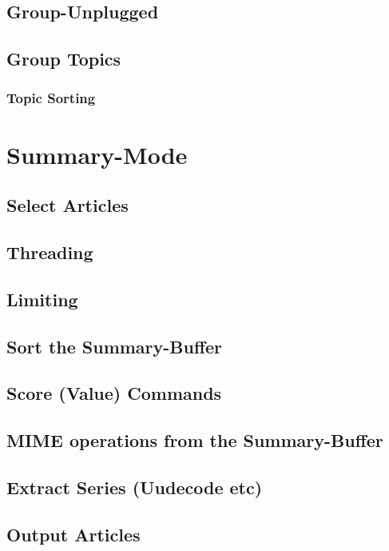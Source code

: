     \subsection*{Group-Unplugged}
    \GroupUnplugged
    \subsection*{Group Topics}
    \GroupTopicsGeneral
    \subsubsection*{Topic Sorting}
    \TopicSorting
%
\section*{Summary-Mode}
\SummaryModeGeneral
    \subsection*{Select Articles}
    \SelectArticles
%
    \subsection*{Threading}
    \Threading
%
    \subsection*{Limiting}
    \Limiting
    \subsection*{Sort the Summary-Buffer}
    \SortSummary
    \subsection*{Score (Value) Commands}
    \Scoring
% 
    \subsection*{MIME operations from the Summary-Buffer}
    \MIMESummary
    \subsection*{Extract Series (Uudecode etc)}
    \ExtractSeries
    \subsection*{Output Articles}
    \OutputArticles
%
